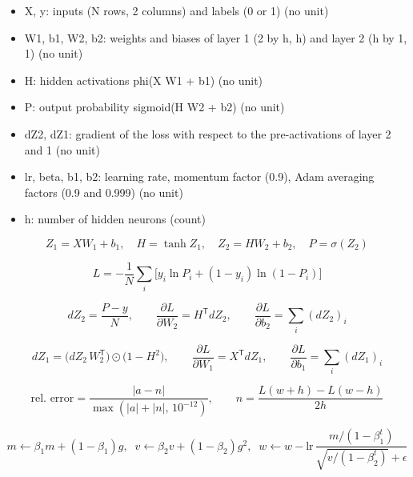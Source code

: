 \documentclass[11pt,a4paper]{article}
\begin{document}
\begin{itemize}[nosep]
\item X, y: inputs (N rows, 2 columns) and labels (0 or 1) (no unit)
\item W1, b1, W2, b2: weights and biases of layer 1 (2 by h, h) and layer 2 (h by 1, 1) (no unit)
\item H: hidden activations phi(X W1 + b1) (no unit)
\item P: output probability sigmoid(H W2 + b2) (no unit)
\item dZ2, dZ1: gradient of the loss with respect to the pre-activations of layer 2 and 1 (no unit)
\item lr, beta, b1, b2: learning rate, momentum factor (0.9), Adam averaging factors (0.9 and 0.999) (no unit)
\item h: number of hidden neurons (count)
\end{itemize}

\begin{equation*}
Z_1 = XW_1 + b_1,\quad H = \tanh Z_1,\quad Z_2 = HW_2 + b_2,\quad P = \sigma(Z_2)
\end{equation*}

\begin{equation*}
L = -\frac1N\sum_i\bigl[y_i\ln P_i + (1-y_i)\ln(1-P_i)\bigr]
\end{equation*}

\begin{equation*}
dZ_2 = \frac{P - y}{N},\qquad \frac{\partial L}{\partial W_2} = H^{\mathsf T} dZ_2,\qquad \frac{\partial L}{\partial b_2} = \sum_i (dZ_2)_i
\end{equation*}

\begin{equation*}
dZ_1 = \bigl(dZ_2\,W_2^{\mathsf T}\bigr)\odot\bigl(1-H^2\bigr),\qquad \frac{\partial L}{\partial W_1} = X^{\mathsf T} dZ_1,\qquad \frac{\partial L}{\partial b_1} = \sum_i (dZ_1)_i
\end{equation*}

\begin{equation*}
\text{rel. error}=\frac{|a-n|}{\max(|a|+|n|,\,10^{-12})},\qquad n=\frac{L(w+h)-L(w-h)}{2h}
\end{equation*}

\begin{equation*}
m\leftarrow \beta_1 m+(1-\beta_1)g,\;\; v\leftarrow \beta_2 v+(1-\beta_2)g^2,\;\; w\leftarrow w-\text{lr}\,\frac{m/(1-\beta_1^t)}{\sqrt{v/(1-\beta_2^t)}+\epsilon}
\end{equation*}
\end{document}
